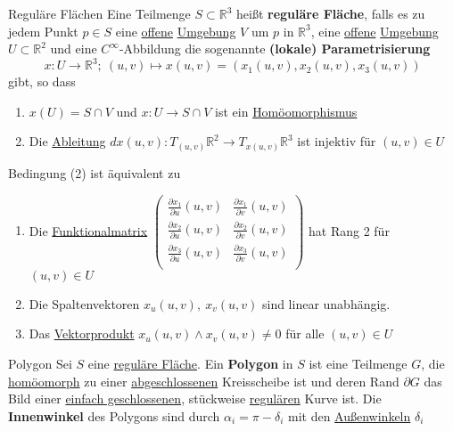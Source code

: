 \begin{titleDef}{Reguläre Flächen}
\label{regFlaeche}
Eine Teilmenge $S\subset\mathbb{R}^3$ heißt \textbf{reguläre Fläche}, falls es zu jedem Punkt $p\in S$ eine \hyperref[offen]{offene} \hyperref[Umgebung]{Umgebung} $V$ um $p$ in $\mathbb{R}^3$, eine \hyperref[offen]{offene} \hyperref[Umgebung]{Umgebung} $U\subset\mathbb{R}^2$ und eine $C^\infty$-Abbildung die sogenannte \textbf{(lokale) Parametrisierung}
$$x:U\to\mathbb{R}^3;\: (u,v)\mapsto x(u,v)=(x_1(u,v),x_2(u,v),x_3(u,v))$$
gibt, so dass
\begin{enumerate}[label=(\arabic*)]
	\item $x(U)=S\cap V$ und $x:U\to S\cap V$ ist ein \hyperref[homoemorph]{Homöomorphismus} 
	\item Die \hyperref[differenzial]{Ableitung} $dx(u,v):T_{(u,v)}\mathbb{R}^2\to T_{x(u,v)}\mathbb{R}^3$ ist injektiv für $(u,v)\in U$
\end{enumerate}
Bedingung (2) ist äquivalent zu
\begin{enumerate}[label=(2\alph*)]
	\item Die \hyperref[funktmatrix]{Funktionalmatrix} $\begin{pmatrix}
		\frac{\partial x_1}{\partial u}(u,v)&\frac{\partial x_1}{\partial v}(u,v)\\
		\frac{\partial x_2}{\partial u}(u,v)&\frac{\partial x_2}{\partial v}(u,v)\\
		\frac{\partial x_3}{\partial u}(u,v)&\frac{\partial x_3}{\partial v}(u,v)\\
		\end{pmatrix}$ hat Rang 2 für $(u,v)\in U$
	\item Die Spaltenvektoren $x_u(u,v),\ x_v(u,v)$ sind linear unabhängig.
	\item Das \hyperref[vektorprodukt]{Vektorprodukt} $x_u(u,v)\wedge x_v(u,v)\neq0$ für alle $(u,v)\in U$
\end{enumerate}
\end{titleDef}

\begin{titleDef}{Polygon}
\label{polygon}
\label{innenwinkel}
Sei $S$ eine \hyperref[regFlaeche]{reguläre Fläche}. Ein \textbf{Polygon} in $S$ ist eine Teilmenge $G$, die \hyperref[homoemorph]{homöomorph} zu einer \hyperref[abgeschlossen]{abgeschlossenen} Kreisscheibe ist und deren Rand $\partial G$ das Bild einer \hyperref[einfachgeschlossen]{einfach geschlossenen}, stückweise \hyperref[regulaer]{regulären} Kurve ist. Die \textbf{Innenwinkel} des Polygons sind durch $\alpha_i=\pi-\delta_i$ mit den \hyperref[aussenwinkel]{Außenwinkeln} $\delta_i$
\end{titleDef}

